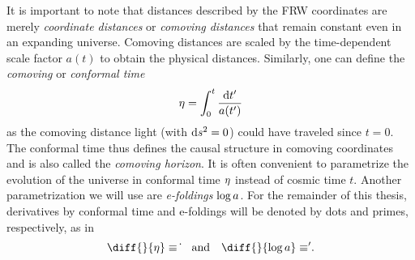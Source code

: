 \documentclass[parskip=half]{scrreprt}
\begin{document}
It is important to note that distances described by the FRW coordinates are merely \emph{coordinate distances} or \emph{comoving distances} that remain constant even in an expanding universe. Comoving distances are scaled by the time-dependent scale factor \(a(t)\) to obtain the physical distances. Similarly, one can define the \emph{comoving} or \emph{conformal time}
\begin{equation}
	\conft = \int_0^t \frac{\dif{t^\prime}}{a(t^\prime)}
\end{equation}
as the comoving distance light (with \(\dif{s}^2=0\)) could have traveled since \(t=0\). The conformal time thus defines the causal structure in comoving coordinates and is also called the \emph{comoving horizon}. It is often convenient to parametrize the evolution of the universe in conformal time \(\eta\) instead of cosmic time \(t\). Another parametrization we will use are \emph{e-foldings} \(\log a\). For the remainder of this thesis, derivatives by conformal time and e-foldings will be denoted by dots and primes, respectively, as in
\begin{equation}
	\diff{}{\conft}\equiv\dconf{} \quad \text{and} \quad \diff{}{\efold}\equiv\defold{}
	\eqpunct{.}
\end{equation}
\end{document}
